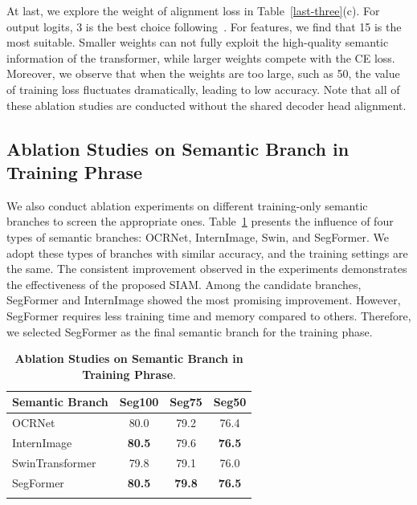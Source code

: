 \documentclass[letterpaper]{article} %
\begin{document}
At last, we explore the weight of alignment loss in Table~\ref{last-three}(c). For output logits, 3 is the best choice following~\cite{shu2021channel}. For features, we find that 15 is the most suitable. Smaller weights can not fully exploit the high-quality semantic information of the transformer, while larger weights compete with the CE loss. Moreover, we observe that when the weights are too large, such as 50, the value of training loss fluctuates dramatically, leading to low accuracy. Note that all of these ablation studies are conducted without the shared decoder head alignment.

\subsection{Ablation Studies on Semantic Branch in Training Phrase}
We also conduct ablation experiments on different training-only semantic branches to screen the appropriate ones. Table~\ref{supptab:Semantic Branch Ablation} presents the influence of four types of semantic branches: OCRNet, InternImage, Swin, and SegFormer. We adopt these types of branches with similar accuracy, and the training settings are the same. The consistent improvement observed in the experiments demonstrates the effectiveness of the proposed SIAM. Among the candidate branches, SegFormer and InternImage showed the most promising improvement. However, SegFormer requires less training time and memory compared to others. Therefore, we selected SegFormer as the final semantic branch for the training phase.

\begin{table}
	\centering
        \caption{\textbf{Ablation Studies on Semantic Branch in Training Phrase}.
        }
        \setlength{\tabcolsep}{1mm}
        \centering
        \begin{tabular}{l|c|c|c}
        \Xhline{1pt}
            Semantic Branch
            &Seg100
            &Seg75
            &Seg50 \\
            \hline
            OCRNet     &80.0 &79.2 &76.4\\
            InternImage  &\textbf{80.5} &79.6 &\textbf{76.5}\\
            SwinTransformer  &79.8 &79.1 &76.0\\
            SegFormer &\textbf{80.5} &\textbf{79.8} &\textbf{76.5}\\
        \Xhline{1pt}
        \end{tabular}
		\label{supptab:Semantic Branch Ablation}
\end{table}
\end{document}
